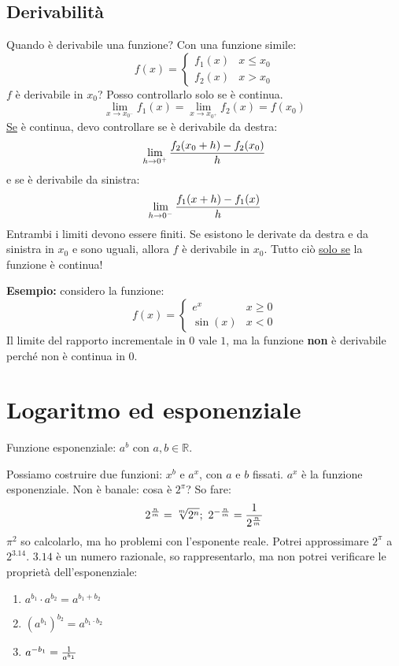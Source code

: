 \documentclass[12pt,a4paper]{article}
\begin{document}
\subsection{Derivabilit\`a}
Quando \`e derivabile una funzione? Con una funzione simile:
$$
f(x) = \begin{cases}
f_1(x) & x \leq x_0 \\
f_2(x) & x > x_0 
\end{cases}
$$
$f$ \`e derivabile in $x_0$? Posso controllarlo solo se \`e continua.
$$
\lim_{x \to x_{0^-}} f_1(x) = \lim_{x \to x_{0^+}} f_2(x) = f(x_0) 
$$
\underline{Se} \`e continua, devo controllare se \`e derivabile da destra:
$$
\lim_{h \to 0^+} {f_2(x_0+h) - f_2(x_0) \over h}
$$
e se \`e derivabile da sinistra:
$$
\lim_{h \to 0^-} {f_1(x+h) - f_1(x) \over h}
$$
Entrambi i limiti devono essere finiti. Se esistono le derivate da destra
e da sinistra in $x_0$ e sono uguali, allora $f$ \`e derivabile in $x_0$.
Tutto ci\`o \underline{solo se} la funzione \`e continua!

\textbf{Esempio:} considero la funzione:
$$
f(x) = \begin{cases}
e^x & x \geq 0 \\
\sin(x) & x < 0
\end{cases}
$$
Il limite del rapporto incrementale in $0$ vale $1$, ma la funzione 
\textbf{non} \`e derivabile perch\'e non \`e continua in $0$.

\newpage
\section{Logaritmo ed esponenziale}
Funzione esponenziale: $a^b$ con $a,b \in \mathbb{R}$.

Possiamo costruire due funzioni: $x^b$ e $a^x$, con $a$ e $b$ fissati.
$a^x$ \`e la funzione esponenziale. Non \`e banale: cosa \`e $2^{\pi}$?
So fare:
$$
2^{n \over m} = \sqrt[m]{2^n} ; \
 2^{-{n \over m}} = {1 \over 2^{n \over m}}
$$
$ \pi^2$ so calcolarlo, ma ho problemi con l'esponente reale.
Potrei approssimare $2^{\pi}$ a $2^{3.14}$. $3.14$ \`e un numero 
razionale, so rappresentarlo, ma non potrei verificare le propriet\`a
dell'esponenziale:
\begin{enumerate}
\item   $ a^{b_1} \cdot a^{b_2} = a^{b_1 + b_2}$
\item   $ \left( a^{b_1} \right)^{b_2} = a^{b_1 \cdot b_2} $
\item   $ a^{-b_1} = {1 \over a^{b_1}} $ 
\end{enumerate}
\end{document}
